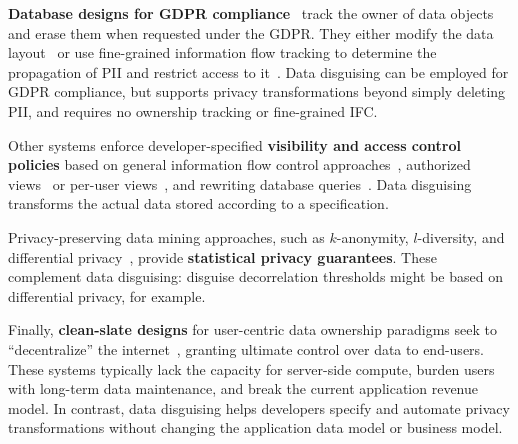 \textbf{Database designs for GDPR compliance}~\cite{schengendb, usershards} track the owner of
data objects and erase them when requested under the GDPR.
%
They either modify the data layout~\cite{usershards} or use fine-grained information flow
tracking to determine the propagation of PII and restrict access to it~\cite{schengendb}.
%
Data disguising can be employed for GDPR compliance, but supports privacy transformations beyond
simply deleting PII, and requires no ownership tracking or fine-grained IFC.
%

%
Other systems enforce developer-specified \textbf{visibility and access control policies}
based on general information flow control approaches~\cite{static, jeeves, jif, hails, ifdb},
%
authorized views~\cite{oracle} or per-user views~\cite{multiverse}, and rewriting database queries~\cite{qapla, sieve}.
%
Data disguising transforms the actual data stored according to a specification.
%



Privacy-preserving data mining approaches, such as $k$-anonymity, $l$-diversity, and
differential privacy~\cite{dataminingmodels, differential}, provide \textbf{statistical privacy
guarantees}.
%
These complement data disguising: disguise decorrelation thresholds might be based on
differential privacy, for example.
%


Finally, \textbf{clean-slate designs} for user-centric data ownership paradigms seek to
``decentralize'' the internet~\cite{diy, solid, amber, oort, w5, blockstack, bstore, databox},
granting ultimate control over data to end-users.
%
These systems typically lack the capacity for server-side compute, burden users with long-term
data maintenance, and break the current application revenue model.
%
In contrast, data disguising helps developers specify and automate privacy transformations
without changing the application data model or business model.
%

